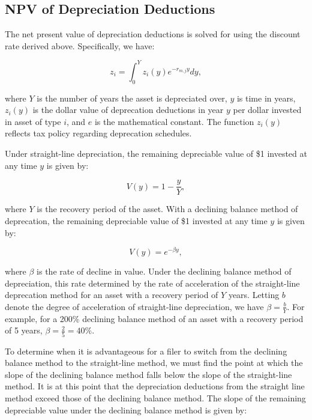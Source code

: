 \documentclass[article,11pt,letterpaper,fleqn]{article}
\theoremstyle{definition}
\numberwithin{equation}{section}
\begin{document}
\subsection{NPV of Depreciation Deductions}

The net present value of depreciation deductions is solved for using the discount rate derived above.  Specifically, we have: 

\begin{equation}
z_{i} = \int_{0}^{Y}z_{i}(y)e^{-r_{m,j}y}dy,
\end{equation}

\noindent\noindent where $Y$ is the number of years the asset is depreciated over, $y$ is time in years, $z_{i}(y)$ is the dollar value of deprecation deductions in year $y$ per dollar invested in asset of type $i$, and $e$ is the mathematical constant.  The function $z_{i}(y)$ reflects tax policy regarding deprecation schedules.  

Under straight-line depreciation, the remaining depreciable value of \$1 invested at any time $y$ is given by: 

\begin{equation}
V(y) =  1-\frac{y}{Y}, 
\end{equation}

\noindent\noindent where $Y$ is the recovery period of the asset.  With a declining balance method of deprecation, the remaining depreciable value of \$1 invested at any time $y$ is given by:

\begin{equation}
V(y) =  e^{-\beta y}, 
\end{equation}

\noindent\noindent where $\beta$ is the rate of decline in value.  Under the declining balance method of depreciation, this rate determined by the rate of acceleration of the straight-line deprecation method for an asset with a recovery period of $Y$ years.  Letting $b$ denote the degree of acceleration of straight-line depreciation, we have $\beta=\frac{b}{Y}$.  For example, for a 200\% declining balance method of an asset with a recovery period of 5 years, $\beta =\frac{2}{5}=40\%$.

To determine when it is advantageous for a filer to switch from the declining balance method to the straight-line method, we must find the point at which the slope of the declining balance method falls below the slope of the straight-line method.  It is at this point that the depreciation deductions from the straight line method exceed those of the declining balance method.  The slope of the remaining depreciable value under the declining balance method is given by:
\end{document}
